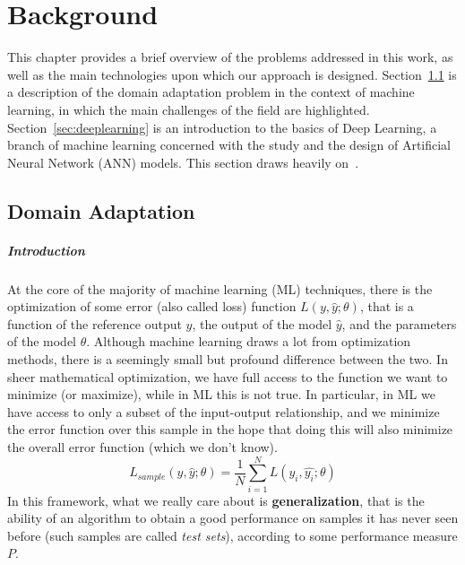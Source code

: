 \documentclass[../main.tex]{subfiles}
\begin{document}
    \chapter{Background}
    This chapter provides a brief overview of the problems addressed in this work, as well as the main
    technologies upon which our approach is designed.
    Section~\ref{sec:domainadapt} is a description of the domain adaptation problem in the context
    of machine learning, in which the main challenges of the field are highlighted.
    Section~\ref{sec:deeplearning} is an introduction to the basics of Deep Learning,
    a branch of machine learning concerned with the study and the design of Artificial Neural Network (ANN) models.
    This section draws heavily on~\cite{Goodfellow-et-al-2016}.

    \section{Domain Adaptation}\label{sec:domainadapt}

    \paragraph{Introduction}
    At the core of the majority of machine learning (ML) techniques, there is the optimization of some
    error (also called loss) function $L(y, \hat{y}; \theta)$, that is a function of the reference output $y$, the output
    of the model $\hat{y}$, and the parameters of the model $\theta$.
    \newline
    Although machine learning draws a lot from optimization methods, there is a seemingly small but profound difference
    between the two. In sheer mathematical optimization, we have full access to the function we want to minimize (or maximize),
    while in ML this is not true. In particular, in ML we have access to only a subset of the input-output relationship,
    and we minimize the error function over this sample in the hope that doing this will also minimize the overall error function
    (which we don't know).
    $$ L_{sample}(y, \hat{y}; \theta) = \frac{1}{N} \sum_{i = 1}^{N} L(y_{i}, \hat{y_{i}}; \theta) $$
    In this framework, what we really care about is \textbf{generalization}, that is the ability of an algorithm to obtain a good
    performance on samples it has never seen before (such samples are called \textit{test sets}), according to some performance measure $P$.
\end{document}
